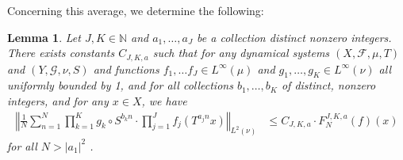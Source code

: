 \documentclass[11pt, oneside]{amsart}   	%
\newcommand{\1}{\mathbbm{1}}
\newcommand{\N}{\mathbb{N}}
\newtheorem{lemma}[theorem]{Lemma}
\theoremstyle{definition}
\begin{document}
Concerning this average, we determine the following:


\begin{lemma}\cite[lemma 8.2]{assani2024higherorderwienerwintnersystems}\label{L:Intermediate 1}
Let $J, K\in \N$ and $a_1, \dots, a_J$ be a collection distinct nonzero integers. There exists constants $C_{J, K, a}$ such that for any dynamical systems $(X, \mathcal{F}, \mu, T)$ and $(Y, \mathcal{G}, \nu, S)$ and functions $f_1, \dots f_J\in L^\infty(\mu)$ and $g_1, \dots, g_K\in L^\infty(\nu)$ all uniformly bounded by 1, and for all collections $b_1, \dots, b_K$ of distinct, nonzero integers, and for any $x\in X$, we have
\begin{align*}
\left\Vert \frac{1}{N} \sum_{n=1}^N  \prod_{k=1}^K g_k \circ S^{b_k n} \cdot \prod_{j=1}^J f_j(T^{a_jn}x)\right\Vert_{L^2(\nu)} &\leq C_{J, K, a} \cdot F^{J, K, a}_N(f)(x)
\end{align*}
for all $N > |a_1|^2$ .
\end{lemma}
\end{document}
